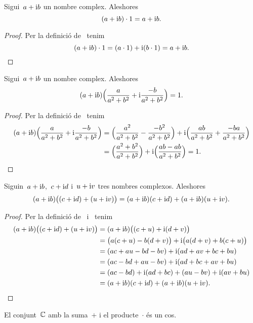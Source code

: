 \documentclass[../Apunts.tex]{subfiles}
\begin{document}
    \begin{proposition}
        \label{prop:element neutre pel producte dels complexos}
        Sigui~\(a+\mathrm{i} b\) un nombre complex.
        Aleshores
        \[(a+\mathrm{i} b)\cdot1=a+\mathrm{i} b.\]
    \end{proposition}
    \begin{proof}
        Per la definició de~ tenim
        \[(a+\mathrm{i} b)\cdot1=(a\cdot1)+\mathrm{i}(b\cdot1)=a+\mathrm{i} b.\qedhere\]
    \end{proof}
    \begin{proposition}
        \label{prop:element invers pel producte de nombres complexos}
        Sigui~\(a+\mathrm{i} b\) un nombre complex.
        Aleshores
        \[
            (a+\mathrm{i} b)\Big(\frac{a}{a^{2}+b^{2}}+\mathrm{i}\frac{-b}{a^{2}+b^{2}}\Big)
            =1.
        \]
    \end{proposition}
    \begin{proof}
        Per la definició de~ tenim
        \begin{align*}
            (a+\mathrm{i} b)\Big(\frac{a}{a^{2}+b^{2}}+\mathrm{i}\frac{-b}{a^{2}+b^{2}}\Big)
            &=\Big(\frac{a^{2}}{a^{2}+b^{2}}-\frac{-b^{2}}{a^{2}+b^{2}}\Big)
            +\mathrm{i}\Big(\frac{ab}{a^{2}+b^{2}}+\frac{-ba}{a^{2}+b^{2}}\Big) \\
            &=\Big(\frac{a^{2}+b^{2}}{a^{2}+b^{2}}\Big)
            +\mathrm{i}\Big(\frac{ab-ab}{a^{2}+b^{2}}\Big)=1.
            \qedhere
        \end{align*}
    \end{proof}
    \begin{proposition}
        \label{prop:distribuitva del producte respecte la suma de nombres complexos}
        Siguin~\(a+\mathrm{i} b\),~\(c+\mathrm{i} d\) i~\(u+\mathrm{i} v\) tres nombres complexos.
        Aleshores
        \[
            (a+\mathrm{i} b)\big((c+\mathrm{i} d)+(u+\mathrm{i} v)\big)
            =(a+\mathrm{i} b)(c+\mathrm{i} d)+(a+\mathrm{i} b)(u+\mathrm{i} v).
        \]
    \end{proposition}
    \begin{proof}
        Per la definició de~
        i~ tenim
        \begin{align*}
            (a+\mathrm{i} b)\big((c+\mathrm{i} d)+(u+\mathrm{i} v)\big)
            &=(a+\mathrm{i} b)\big((c+u)+\mathrm{i}(d+v)\big) \\
            &=\big(a(c+u)-b(d+v)\big)+\mathrm{i}\big(a(d+v)+b(c+u)\big) \\
            &=(ac+au-bd-bv)+\mathrm{i}(ad+av+bc+bu) \\
            &=(ac-bd+au-bv)+\mathrm{i}(ad+bc+av+bu)\\
            &=(ac-bd)+\mathrm{i}(ad+bc)+(au-bv)+\mathrm{i}(av+bu) \\
            &=(a+\mathrm{i} b)(c+\mathrm{i} d)+(a+\mathrm{i} b)(u+\mathrm{i} v).
            \qedhere
        \end{align*}
    \end{proof}
    \begin{corollary}
        \label{cor:els complexos formen un cos}
        El conjunt~\(\mathbb{C}\) amb la suma~\(+\)
        i el producte~\(\cdot\) és un cos.
    \end{corollary}
\end{document}
